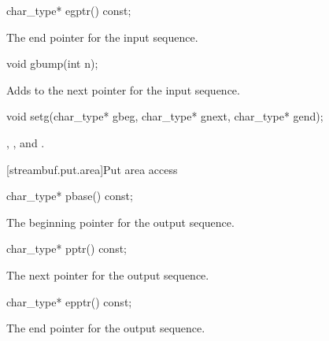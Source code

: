 %
\begin{itemdecl}
char_type* egptr() const;
\end{itemdecl}

\begin{itemdescr}
\pnum
\returns
The end pointer for the input sequence.
\end{itemdescr}

%
\begin{itemdecl}
void gbump(int n);
\end{itemdecl}

\begin{itemdescr}
\pnum
\effects
Adds  to the next pointer for the input sequence.
\end{itemdescr}

%
\begin{itemdecl}
void setg(char_type* gbeg, char_type* gnext, char_type* gend);
\end{itemdecl}

\begin{itemdescr}
\pnum
\postconditions
{},
,
and
.
\end{itemdescr}

[streambuf.put.area]{Put area access}

%
\begin{itemdecl}
char_type* pbase() const;
\end{itemdecl}

\begin{itemdescr}
\pnum
\returns
The beginning pointer for the output sequence.
\end{itemdescr}

%
\begin{itemdecl}
char_type* pptr() const;
\end{itemdecl}

\begin{itemdescr}
\pnum
\returns
The next pointer for the output sequence.
\end{itemdescr}

%
\begin{itemdecl}
char_type* epptr() const;
\end{itemdecl}

\begin{itemdescr}
\pnum
\returns
The end pointer for the output sequence.
\end{itemdescr}

